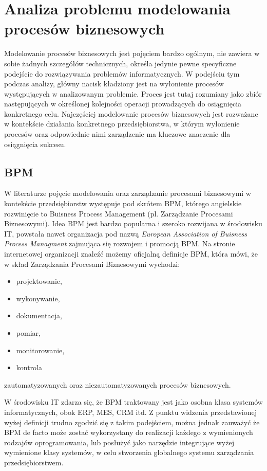 \chapter{Analiza problemu modelowania procesów biznesowych}
\label{cha:analizaModelowaniaProcesowBiznesowych}

Modelowanie procesów biznesowych jest pojęciem  bardzo ogólnym, nie zawiera w sobie żadnych szczegółów technicznych, określa jedynie pewne specyficzne podejście do rozwiązywania problemów informatycznych. W podejściu tym podczas analizy, główny nacisk kładziony jest na wyłonienie procesów występujących w analizowanym problemie. Proces jest tutaj rozumiany jako zbiór następujących w określonej kolejności operacji prowadzących do osiągnięcia konkretnego celu. Najczęściej modelowanie procesów biznesowych jest rozważane w kontekście działania konkretnego przedsiębiorstwa, w którym wyłonienie procesów oraz odpowiednie nimi zarządzenie ma kluczowe znaczenie dla osiągnięcia sukcesu. 


\section{BPM}
\label{sec:bpm}

W literaturze pojęcie modelowania oraz zarządzanie procesami biznesowymi w kontekście przedsiębiorstw występuje pod skrótem BPM, którego angielskie rozwinięcie to Buisness Process Management (pl.  Zarządzanie Procesami Biznesowymi). Idea BPM jest bardzo popularna i szeroko rozwijana w środowisku IT, powstała nawet organizacja pod nazwą \textit{European Association of Buisness Process Managment} zajmująca się rozwojem i promocją BPM.  Na stronie internetowej organizacji znaleźć możemy oficjalną definicje BPM, która mówi, że w skład Zarządzania Procesami Biznesowymi wychodzi:
\begin{itemize}
\item projektowanie,
\item wykonywanie,
\item dokumentacja,
\item pomiar,
\item monitorowanie,
\item kontrola
\end{itemize}
zautomatyzowanych oraz niezautomatyzowanych procesów biznesowych.~\cite{EAOBPMWeb}

W środowisku IT zdarza się, że BPM traktowany jest jako osobna klasa systemów informatycznych, obok ERP, MES, CRM itd. Z punktu widzenia przedstawionej wyżej definicji trudno zgodzić się z takim podejściem, można jednak zauważyć że BPM de facto może zostać wykorzystany do realizacji każdego z wymienionych rodzajów oprogramowania, lub posłużyć jako narzędzie integrujące wyżej wymienione klasy systemów, w celu stworzenia globalnego systemu zarządzania przedsiębiorstwem. ~\cite{wiBPMA}



